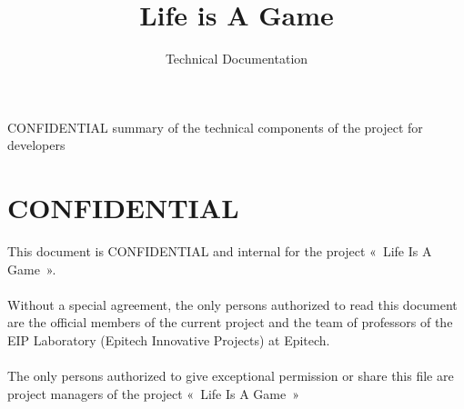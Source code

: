 \documentclass{life-fr}
\begin{document}
\title{Life is A Game}
\subtitle{Technical Documentation}



\summary
{
  CONFIDENTIAL summary of the technical components of the project for developers
}

\maketitle


\chapter*{CONFIDENTIAL}
{
  This document is CONFIDENTIAL and internal for the project «~Life Is A Game~».\\
  \\
  Without a special agreement, the only persons authorized to read
  this document are the official members of the current project and the team
  of professors of the EIP Laboratory (Epitech Innovative Projects) at Epitech.\\
  \\
  The only persons authorized to give exceptional permission
  or share this file are project managers of the project «~Life Is A Game~»
  
}


\authorspageen

\end{document}
